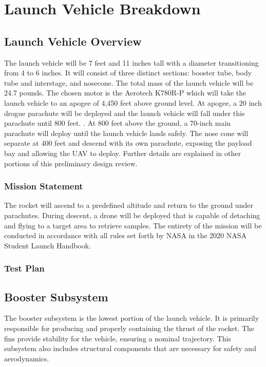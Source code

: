 \chapter{Launch Vehicle Breakdown}

\section{Launch Vehicle Overview}
The launch vehicle will be 7 feet and 11 inches tall with a diameter transitioning from 4 to 6 inches. It will consist of three distinct sections: booster tube, body tube and interstage, and nosecone. The total mass of the launch vehicle will be 24.7 pounds. The chosen motor is the Aerotech K780R-P which will take the launch vehicle to an apogee of 4,450 feet above ground level. At apogee, a 20 inch drogue parachute will be deployed and the launch vehicle will fall under this parachute until 800 feet. . At 800 feet above the ground, a 70-inch main parachute will deploy until the launch vehicle lands safely. The nose cone will separate at 400 feet and descend with its own parachute, exposing the payload bay and allowing the UAV to deploy. Further details are explained in other portions of this preliminary design review.

    \subsection{Mission Statement}
The rocket will ascend to a predefined altitude and return to the ground under parachutes. During descent, a drone will be deployed that is capable of detaching and flying to a target area to retrieve samples. The entirety of the mission will be conducted in accordance with all rules set forth by NASA in the 2020 NASA Student Launch Handbook.

    \subsection{Test Plan}
    
    

\section{Booster Subsystem}
The booster subsystem is the lowest portion of the launch vehicle. It is primarily responsible for producing and properly containing the thrust of the rocket. The fins provide stability for the vehicle, ensuring a nominal trajectory. This subsystem also includes structural components that are necessary for safety and aerodynamics.

